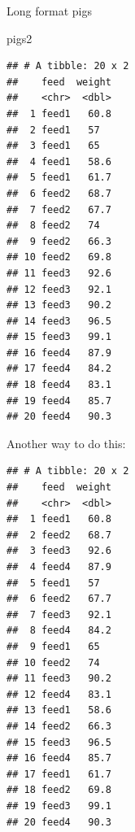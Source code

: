 \documentclass[ignorenonframetext,]{beamer}
\newenvironment{Shaded}{\begin{snugshade}}{\end{snugshade}}
\newcommand{\DataTypeTok}[1]{\textcolor[rgb]{0.13,0.29,0.53}{#1}}
\newcommand{\KeywordTok}[1]{\textcolor[rgb]{0.13,0.29,0.53}{\textbf{#1}}}
\newcommand{\NormalTok}[1]{#1}
\newcommand{\OperatorTok}[1]{\textcolor[rgb]{0.81,0.36,0.00}{\textbf{#1}}}
\newcommand{\StringTok}[1]{\textcolor[rgb]{0.31,0.60,0.02}{#1}}
\begin{document}
\begin{frame}[fragile]{Long format pigs}
\protect\hypertarget{long-format-pigs}{}

\begin{Shaded}
\begin{Highlighting}[]
\NormalTok{pigs2}
\end{Highlighting}
\end{Shaded}

\begin{verbatim}
## # A tibble: 20 x 2
##    feed  weight
##    <chr>  <dbl>
##  1 feed1   60.8
##  2 feed1   57  
##  3 feed1   65  
##  4 feed1   58.6
##  5 feed1   61.7
##  6 feed2   68.7
##  7 feed2   67.7
##  8 feed2   74  
##  9 feed2   66.3
## 10 feed2   69.8
## 11 feed3   92.6
## 12 feed3   92.1
## 13 feed3   90.2
## 14 feed3   96.5
## 15 feed3   99.1
## 16 feed4   87.9
## 17 feed4   84.2
## 18 feed4   83.1
## 19 feed4   85.7
## 20 feed4   90.3
\end{verbatim}

\end{frame}

\begin{frame}[fragile]{Another way to do this:}
\protect\hypertarget{another-way-to-do-this}{}

\begin{Shaded}
\end{Shaded}

\begin{verbatim}
## # A tibble: 20 x 2
##    feed  weight
##    <chr>  <dbl>
##  1 feed1   60.8
##  2 feed2   68.7
##  3 feed3   92.6
##  4 feed4   87.9
##  5 feed1   57  
##  6 feed2   67.7
##  7 feed3   92.1
##  8 feed4   84.2
##  9 feed1   65  
## 10 feed2   74  
## 11 feed3   90.2
## 12 feed4   83.1
## 13 feed1   58.6
## 14 feed2   66.3
## 15 feed3   96.5
## 16 feed4   85.7
## 17 feed1   61.7
## 18 feed2   69.8
## 19 feed3   99.1
## 20 feed4   90.3
\end{verbatim}

\end{frame}
\end{document}
